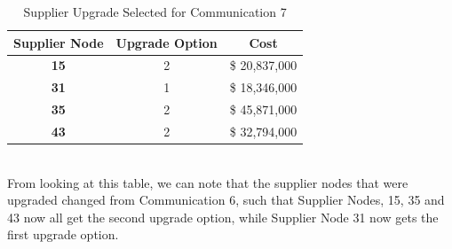 \documentclass{article}
\begin{document}
\begin{table}[htb]
    \centering
    \color{black}
    \begin{tabular}{|c:c:c|}
        \hline
        \textbf{Supplier Node} & \textbf{Upgrade Option} & \textbf{Cost} \\
        \hline
        \textbf{15} & 2 & \$ 20,837,000 \\ \hdashline
        \textbf{31} & 1 & \$ 18,346,000 \\ \hdashline
        \textbf{35} & 2 & \$ 45,871,000 \\ \hdashline
        \textbf{43} & 2 & \$ 32,794,000 \\ \hline
    \end{tabular}
    \caption{Supplier Upgrade Selected for Communication 7}
    \label{tab:upgradeoptscomm7}
\end{table}
\renewcommand\baselinestretch{1}
\noindent \\
From looking at this table, we can note that the supplier nodes that were upgraded changed from Communication 6, such that Supplier Nodes, 15, 35 and 43 now all get the second upgrade option, while Supplier Node 31 now gets the first upgrade option.
\newpage
\end{document}

